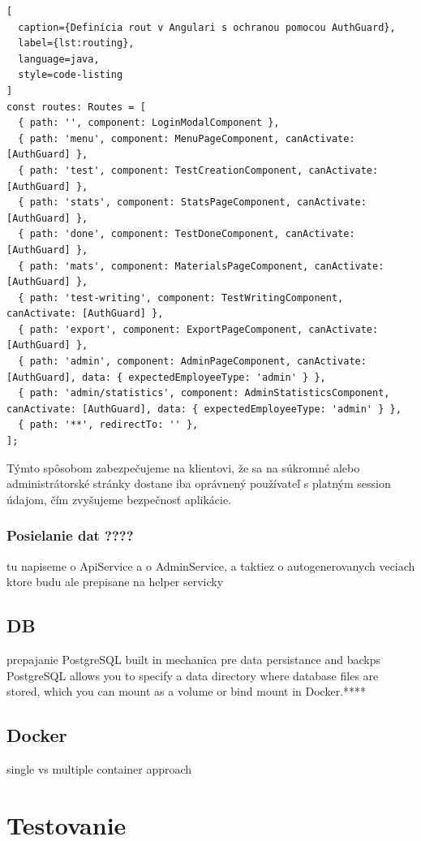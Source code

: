 \begin{lstlisting}[
  caption={Definícia rout v Angulari s ochranou pomocou AuthGuard},
  label={lst:routing},
  language=java,
  style=code-listing
]
const routes: Routes = [
  { path: '', component: LoginModalComponent },
  { path: 'menu', component: MenuPageComponent, canActivate: [AuthGuard] },
  { path: 'test', component: TestCreationComponent, canActivate: [AuthGuard] },
  { path: 'stats', component: StatsPageComponent, canActivate: [AuthGuard] },
  { path: 'done', component: TestDoneComponent, canActivate: [AuthGuard] },
  { path: 'mats', component: MaterialsPageComponent, canActivate: [AuthGuard] },
  { path: 'test-writing', component: TestWritingComponent, canActivate: [AuthGuard] },
  { path: 'export', component: ExportPageComponent, canActivate: [AuthGuard] },
  { path: 'admin', component: AdminPageComponent, canActivate: [AuthGuard], data: { expectedEmployeeType: 'admin' } },
  { path: 'admin/statistics', component: AdminStatisticsComponent, canActivate: [AuthGuard], data: { expectedEmployeeType: 'admin' } },
  { path: '**', redirectTo: '' },
];
\end{lstlisting}

Týmto spôsobom zabezpečujeme na klientovi, že sa na súkromné alebo administrátorské stránky dostane iba oprávnený používateľ s platným session údajom, čím zvyšujeme bezpečnosť aplikácie.

 
 

 \subsubsection{Posielanie dat ????}
 tu napiseme o ApiService a o AdminService, a taktiez o autogenerovanych veciach ktore budu ale prepisane na helper servicky 

 
 \subsection{DB}
 prepajanie
  PostgreSQL
  built in mechanica pre data persistance and backps PostgreSQL allows you to specify a data directory where database files are stored, which you can mount as a volume or bind mount in Docker.****

  \subsection{Docker}
  single vs multiple container approach

  \section{Testovanie}